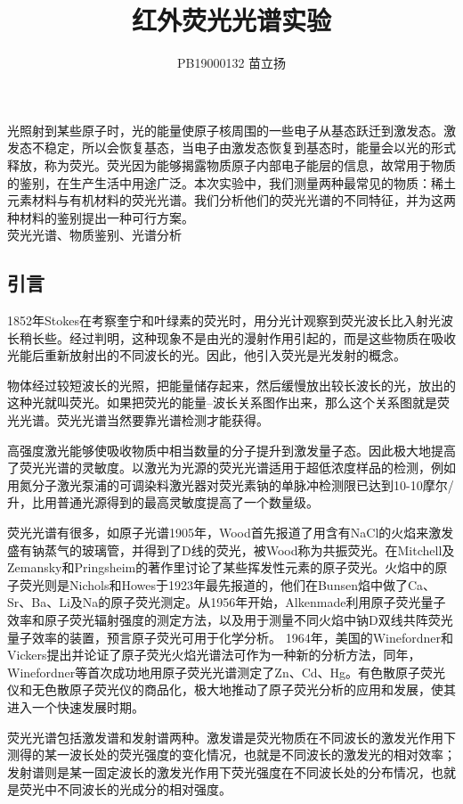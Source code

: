 \documentclass[hyperref]{ctexart}
\title{\textbf{红外荧光光谱实验}}
\author{\sffamily PB19000132 苗立扬}
\date{}
\begin{document}
	\maketitle
	光照射到某些原子时，光的能量使原子核周围的一些电子从基态跃迁到激发态。激发态不稳定，所以会恢复基态，当电子由激发态恢复到基态时，能量会以光的形式释放，称为荧光。荧光因为能够揭露物质原子内部电子能层的信息，故常用于物质的鉴别，在生产生活中用途广泛。本次实验中，我们测量两种最常见的物质：稀土元素材料与有机材料的荧光光谱。我们分析他们的荧光光谱的不同特征，并为这两种材料的鉴别提出一种可行方案。\\
	荧光光谱、物质鉴别、光谱分析
	\begin{multicols}{2}
		\section{引言}
		1852年Stokes在考察奎宁和叶绿素的荧光时，用分光计观察到荧光波长比入射光波长稍长些。经过判明，这种现象不是由光的漫射作用引起的，而是这些物质在吸收光能后重新放射出的不同波长的光。因此，他引入荧光是光发射的概念。
		
		物体经过较短波长的光照，把能量储存起来，然后缓慢放出较长波长的光，放出的这种光就叫荧光。如果把荧光的能量--波长关系图作出来，那么这个关系图就是荧光光谱。荧光光谱当然要靠光谱检测才能获得。
		
		高强度激光能够使吸收物质中相当数量的分子提升到激发量子态。因此极大地提高了荧光光谱的灵敏度。以激光为光源的荧光光谱适用于超低浓度样品的检测，例如用氮分子激光泵浦的可调染料激光器对荧光素钠的单脉冲检测限已达到10-10摩尔/升，比用普通光源得到的最高灵敏度提高了一个数量级。
		
		荧光光谱有很多，如原子光谱1905年，Wood首先报道了用含有NaCl的火焰来激发盛有钠蒸气的玻璃管，并得到了D线的荧光，被Wood称为共振荧光。在Mitchell及 Zemansky和Pringsheim的著作里讨论了某些挥发性元素的原子荧光。火焰中的原子荧光则是Nichols和Howes于1923年最先报道的，他们在Bunsen焰中做了Ca、Sr、Ba、Li及Na的原子荧光测定。从1956年开始，Alkenmade利用原子荧光量子效率和原子荧光辐射强度的测定方法，以及用于测量不同火焰中钠D双线共阵荧光量子效率的装置，预言原子荧光可用于化学分析。 1964年，美国的Winefordner和Vickers提出并论证了原子荧光火焰光谱法可作为一种新的分析方法，同年，Winefordner等首次成功地用原子荧光光谱测定了Zn、Cd、Hg。有色散原子荧光仪和无色散原子荧光仪的商品化，极大地推动了原子荧光分析的应用和发展，使其进入一个快速发展时期。
		
		荧光光谱包括激发谱和发射谱两种。激发谱是荧光物质在不同波长的激发光作用下测得的某一波长处的荧光强度的变化情况，也就是不同波长的激发光的相对效率；发射谱则是某一固定波长的激发光作用下荧光强度在不同波长处的分布情况，也就是荧光中不同波长的光成分的相对强度。
		

\end{multicols}
\end{document}
